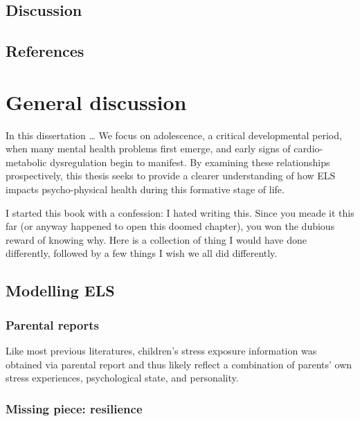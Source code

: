 \documentclass[
  letterpaper,
  DIV=11,
  numbers=noendperiod]{scrreport}
\begin{document}
\section{Discussion}\label{discussion-5}

\section*{References}\label{references-6}



\chapter{General discussion}\label{general-discussion}

In this dissertation \ldots{} We focus on adolescence, a critical
developmental period, when many mental health problems first emerge, and
early signs of cardio-metabolic dysregulation begin to manifest. By
examining these relationships prospectively, this thesis seeks to
provide a clearer understanding of how ELS impacts psycho-physical
health during this formative stage of life.

I started this book with a confession: I hated writing this. Since you
meade it this far (or anyway happened to open this doomed chapter), you
won the dubious reward of knowing why. Here is a collection of thing I
would have done differently, followed by a few things I wish we all did
differently.

\section{Modelling ELS}\label{modelling-els}

\subsection{Parental reports}\label{parental-reports}

Like most previous literatures, children's stress exposure information
was obtained via parental report and thus likely reflect a combination
of parents' own stress experiences, psychological state, and
personality.

\subsection{Missing piece: resilience}\label{missing-piece-resilience}
\end{document}
